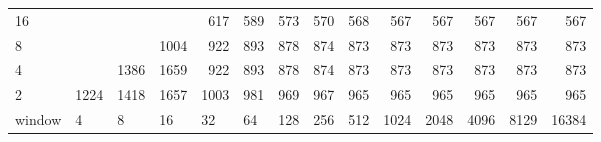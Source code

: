 \begin{table}[h]
{\begin{tabular}{lrrrrrrrrrrrrr}
			\multicolumn{1}{|l|}{16} &  &  &  & \cellcolor[HTML]{E60000}617 & \cellcolor[HTML]{E69900}589 & \cellcolor[HTML]{E69900}573 & \cellcolor[HTML]{E69900}570 & \cellcolor[HTML]{E69900}568 & \cellcolor[HTML]{E69900}567 & \cellcolor[HTML]{E69900}567 & \cellcolor[HTML]{E69900}567 & \cellcolor[HTML]{E69900}567 & \cellcolor[HTML]{E69900}567 \\ \cline{1-1}
			\multicolumn{1}{|l|}{8} &  &  & \cellcolor[HTML]{4C00E6}1004 & \cellcolor[HTML]{9900E6}922 & \cellcolor[HTML]{9900E6}893 & \cellcolor[HTML]{9900E6}878 & \cellcolor[HTML]{9900E6}874 & \cellcolor[HTML]{9900E6}873 & \cellcolor[HTML]{9900E6}873 & \cellcolor[HTML]{9900E6}873 & \cellcolor[HTML]{9900E6}873 & \cellcolor[HTML]{9900E6}873 & \cellcolor[HTML]{9900E6}873 \\ \cline{1-1}
			\multicolumn{1}{|l|}{4} &  & \cellcolor[HTML]{4C00E6}1386 & \cellcolor[HTML]{4C00E6}1659 & \cellcolor[HTML]{9900E6}922 & \cellcolor[HTML]{9900E6}893 & \cellcolor[HTML]{9900E6}878 & \cellcolor[HTML]{9900E6}874 & \cellcolor[HTML]{9900E6}873 & \cellcolor[HTML]{9900E6}873 & \cellcolor[HTML]{9900E6}873 & \cellcolor[HTML]{9900E6}873 & \cellcolor[HTML]{9900E6}873 & \cellcolor[HTML]{9900E6}873 \\ \cline{1-1}
			\multicolumn{1}{|l|}{2} & \cellcolor[HTML]{4C00E6}1224 & \cellcolor[HTML]{4C00E6}1418 & \cellcolor[HTML]{4C00E6}1657 & \cellcolor[HTML]{4C00E6}1003 & \cellcolor[HTML]{9900E6}981 & \cellcolor[HTML]{9900E6}969 & \cellcolor[HTML]{9900E6}967 & \cellcolor[HTML]{9900E6}965 & \cellcolor[HTML]{9900E6}965 & \cellcolor[HTML]{9900E6}965 & \cellcolor[HTML]{9900E6}965 & \cellcolor[HTML]{9900E6}965 & \cellcolor[HTML]{9900E6}965 \\ \hline
			\multicolumn{1}{l|}{window} & \multicolumn{1}{l|}{4} & \multicolumn{1}{l|}{8} & \multicolumn{1}{l|}{16} & \multicolumn{1}{l|}{32} & \multicolumn{1}{l|}{64} & \multicolumn{1}{l|}{128} & \multicolumn{1}{l|}{256} & \multicolumn{1}{l|}{512} & \multicolumn{1}{l|}{1024} & \multicolumn{1}{l|}{2048} & \multicolumn{1}{l|}{4096} & \multicolumn{1}{l|}{8129} & \multicolumn{1}{l|}{16384} \\ \cline{2-14} 
		\end{tabular}
	}
\end{table}


